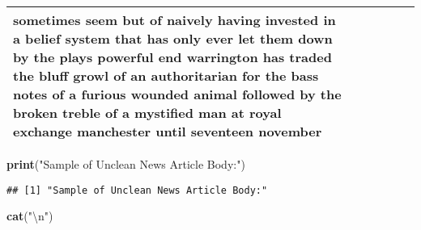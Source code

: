\documentclass[]{article}
\newenvironment{Shaded}{\begin{snugshade}}{\end{snugshade}}
\newcommand{\KeywordTok}[1]{\textcolor[rgb]{0.13,0.29,0.53}{\textbf{#1}}}
\newcommand{\DecValTok}[1]{\textcolor[rgb]{0.00,0.00,0.81}{#1}}
\newcommand{\CharTok}[1]{\textcolor[rgb]{0.31,0.60,0.02}{#1}}
\newcommand{\StringTok}[1]{\textcolor[rgb]{0.31,0.60,0.02}{#1}}
\newcommand{\OperatorTok}[1]{\textcolor[rgb]{0.81,0.36,0.00}{\textbf{#1}}}
\newcommand{\NormalTok}[1]{#1}
\begin{document}
\begin{table}[!h]
\begin{tabular}[t]{llllll}
sometimes seem but of naively having invested in a belief system that has only ever let them down by the plays powerful end warrington has traded the bluff growl of an authoritarian for the bass notes of a furious wounded animal followed by the broken treble of a mystified man  at royal exchange manchester until seventeen november\\
\bottomrule
\end{tabular}
\end{table}


\begin{Shaded}
\begin{Highlighting}[]
\KeywordTok{print}\NormalTok{(}\StringTok{"Sample of Unclean News Article Body:"}\NormalTok{)}
\end{Highlighting}
\end{Shaded}

\begin{verbatim}
## [1] "Sample of Unclean News Article Body:"
\end{verbatim}

\begin{Shaded}
\begin{Highlighting}[]
\KeywordTok{cat}\NormalTok{(}\StringTok{"}\CharTok{\textbackslash{}n}\StringTok{"}\NormalTok{)}
\end{Highlighting}
\end{Shaded}

\begin{Shaded}
\end{Shaded}
\end{document}
